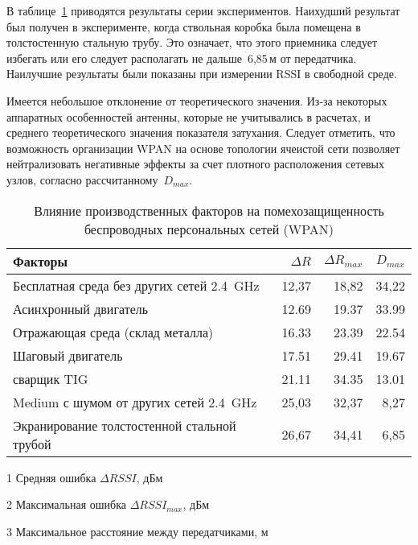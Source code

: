 В таблице~\cref{tab-2} приводятся результаты серии экспериментов. Наихудший результат был получен в эксперименте, когда ствольная коробка была помещена в толстостенную стальную трубу. Это означает, что этого приемника следует избегать или его следует располагать не дальше~6,85\,м от передатчика. Наилучшие результаты были показаны при измерении RSSI в свободной среде.

Имеется небольшое отклонение от теоретического значения. Из-за некоторых аппаратных особенностей антенны, которые не учитывались в расчетах, и среднего теоретического значения показателя затухания. Следует отметить, что возможность организации WPAN на основе топологии ячеистой сети позволяет нейтрализовать негативные эффекты за счет плотного расположения сетевых узлов, согласно рассчитанному~$D_{max}$.

\begin{table} [!ht]
\centering
\caption{Влияние производственных факторов на помехозащищенность беспроводных персональных сетей (WPAN)} \vspace{4pt}
\label{tab-2}
\begin{threeparttable}
\begin{tabularx}{\linewidth}{@{} lrrr}
	\toprule
	\textbf{Факторы} &
	{\small $\Delta R$} \tnote{1} &
	{\small $\Delta R_{max}$} \tnote{2} &
	{\small $D_{max}$} \tnote{3} \\
	\midrule
	\small Бесплатная среда без других сетей \SI{2,4}{\giga\hertz} & 12,37 & 18,82 & 34,22 \\
	\small Асинхронный двигатель & 12.69 & 19.37 & 33.99 \\
	\small Отражающая среда (склад металла) & 16.33 & 23.39 & 22.54 \\
	\small Шаговый двигатель & 17.51 & 29.41 & 19.67 \\
	\small сварщик TIG & 21.11 & 34.35 & 13.01 \\
	\small Medium с шумом от других сетей \SI{2,4}{\giga\hertz} & 25,03 & 32,37 & 8,27 \\
	\small Экранирование толстостенной стальной трубой & 26,67 & 34,41 & 6,85 \\
	\bottomrule
\end{tabularx}
\begin{tablenotes} \footnotesize
	\item [1] Средняя ошибка $\Delta RSSI$, дБм
	\item [2] Максимальная ошибка $\Delta RSSI_{max}$, дБм
	\item [3] Максимальное расстояние между передатчиками, м
\end{tablenotes}
\end{threeparttable}
\end{table}

